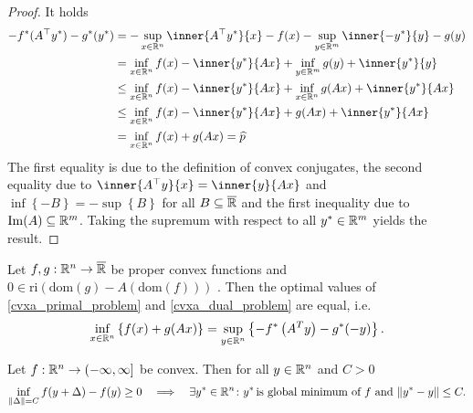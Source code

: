 \begin{proof}
  It holds
  \begin{align*}
    - f^*(A^\top y^*) - g^*(y^*) 
    &=
      -\sup_{x\in \R^n}\inner{A^\top y^*}{x}-f(x)
      -\sup_{y\in \R^m}\inner{-y^*}{y}-g(y)
      \\
    &=
    \inf_{x\in \R^n}f(x)-\inner{y^*}{Ax}
      +\inf_{y\in \R^m}g(y)+\inner{y^*}{y}
      \\
    &\le
      \inf_{x\in \R^n}f(x)-\inner{y^*}{Ax}
      +\inf_{x\in \R^n}g(Ax)+\inner{y^*}{Ax}
      \\
    &\le
      \inf_{x\in \R^n}f(x)-\inner{y^*}{Ax} + g(Ax) + \inner{y^*}{Ax}
      \\
    &=  
      \inf_{x\in \R^n}f(x)+g(Ax)
    =
      \widehat{p}
  \end{align*}
  The first equality is due to the definition of convex conjugates, the second equality due to $\inner{A^\top y}{x}=\inner{y}{Ax}$ and $\inf \left\{ -B \right\}=-\sup \left\{ B \right\}$ for all $B \subseteq \overline{\mathbb{R}}$ and the first inequality due to $\mathrm{Im}(A)\subseteq \mathbb{R}^m$.
  Taking the supremum with respect to all 
  $y^*\in\mathbb{R}^m$
  yields the result.
\end{proof}
\begin{theorem}
  \label{cvxa_fenchel_theorem}
  Let 
  $f, g : \mathbb{R}^n \to \overline{\mathbb{R}}$ 
  be proper convex functions
  and
  $0 \in \text{ri}(\text{dom}(g) - A (\text{dom}(f)) )$
  .
  Then the optimal values of \eqref{cvxa_primal_problem} and \eqref{cvxa_dual_problem} are equal, 
  i.e.
  \begin{gather}
    \inf_{x \in \mathbb{R}^n} 
    \left\{ f(x) + g(Ax) \right\}
    =
    \sup_{y \in \mathbb{R}^n} \left\{   -f^* \left( A^T y \right) - g^*(-y) \right\}
    .
  \end{gather}
\end{theorem}
\begin{lemma}
  \label{syu_1_result}
  Let 
  $f : \mathbb{R}^n \to (-\infty, \infty]$ 
  be convex.
  Then 
  for all $y \in \mathbb{R}^n$ and $C>0$ 
    \begin{gather}
      \label{7060_0}
      \inf_{\left\lVert\Delta\right\rVert=C} f(y+\Delta) - f(y) \ge 0 \quad
      \Longrightarrow
      \quad
    \exists y^* \in \mathbb{R}^n
    \colon
    y^* \,\text{is global minimum of $f$ and}\,
      \left\lVert y^* - y\right\rVert \le C.
    \end{gather}
\end{lemma}
